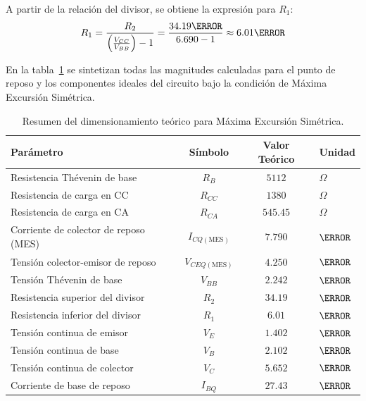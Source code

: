A partir de la relación del divisor, se obtiene la expresión para $R_1$:
\begin{equation}
  R_1 = \frac{R_2}{\left(\frac{V_{CC}}{V_{BB}}\right) - 1} = \frac{34.19\kohm}{6.690 - 1} \approx 6.01\kohm
  \label{eq:R1_teorica}
\end{equation}

En la tabla~\ref{tab:resumen_diseno_teorico} se sintetizan todas las magnitudes calculadas para el punto de reposo y los
componentes ideales del circuito bajo la condición de Máxima Excursión Simétrica.

\begin{table}[!ht]
  \centering
  \begin{tabular}{|l|c|c|l|}
    \hline
    \textbf{Parámetro} & \textbf{Símbolo} & \textbf{Valor Teórico} & \textbf{Unidad} \\
    \hline
    Resistencia Thévenin de base & $R_B$ & $5112$ & $\Omega$ \\
    Resistencia de carga en CC & $R_{CC}$ & $1380$ & $\Omega$ \\
    Resistencia de carga en CA & $R_{CA}$ & $545.45$ & $\Omega$ \\
    Corriente de colector de reposo (MES) & $I_{CQ(\text{MES})}$ & $7.790$ & $\mA$ \\
    Tensión colector-emisor de reposo & $V_{CEQ(\text{MES})}$ & $4.250$ & $\V$ \\
    Tensión Thévenin de base & $V_{BB}$ & $2.242$ & $\V$ \\
    Resistencia superior del divisor & $R_2$ & $34.19$ & $\kohm$ \\
    Resistencia inferior del divisor & $R_1$ & $6.01$ & $\kohm$ \\
    Tensión continua de emisor & $V_E$ & $1.402$ & $\V$ \\
    Tensión continua de base & $V_B$ & $2.102$ & $\V$ \\
    Tensión continua de colector & $V_C$ & $5.652$ & $\V$ \\
    Corriente de base de reposo & $I_{BQ}$ & $27.43$ & $\uA$ \\
    \hline
  \end{tabular}
  \caption{Resumen del dimensionamiento teórico para Máxima Excursión Simétrica.}
  \label{tab:resumen_diseno_teorico}
\end{table}
